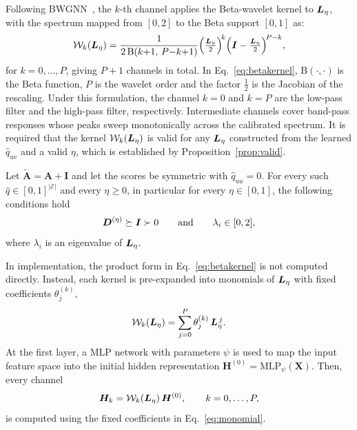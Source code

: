 Following BWGNN~\citep{BWGNN}, the $k$-th channel applies the Beta-wavelet kernel to $\bm{L}_{\eta}$, with the spectrum mapped from $[0,2]$ to the Beta support $[0,1]$ as:
\begin{equation}
\mathcal{W}_k(\bm{L}_{\eta})
=\frac{1}{2\,\mathrm B(k{+}1,\,P{-}k{+}1)}
\Bigl(\tfrac{\bm{L}_{\eta}}{2}\Bigr)^{\!k}
\Bigl(\bm I-\tfrac{\bm{L}_{\eta}}{2}\Bigr)^{\!P-k},
\label{eq:betakernel}
\end{equation}
for $k=0,\dots,P$, giving $P+1$ channels in total.
In Eq.~\eqref{eq:betakernel}, $\mathrm B(\cdot,\cdot)$ is the Beta function, $P$ is the wavelet order and
the factor $\tfrac12$ is the Jacobian of the rescaling.
Under this formulation, the channel $k=0$  and $k=P$ are the low-pass filter and the high-pass filter, respectively.
Intermediate channels cover band-pass responses whose peaks sweep monotonically across the calibrated spectrum.
It is required that the kernel $\mathcal{W}_k(\bm{L}_{\eta})$ is valid for any $\bm{L}_{\eta}$ constructed from the learned $\hat{q}_{uv}$ and a valid $\eta$, which is established by Proposition~\ref{prop:valid}.
\begin{proposition}\label{prop:valid}
Let $\tilde{\bm A}=\bm A+\bm I$ and let the scores be symmetric with $\hat q_{uu}=0$. For every such $\hat q\in[0,1]^{|\mathcal E|}$ and every $\eta\ge0$, in particular for every $\eta\in[0,1]$, the following conditions hold
\[
\bm{D}^{(\eta)}\succeq \bm I \succ 0
\qquad\text{and}\qquad
\lambda_i\in[0,2],
\]
where $\lambda_i$ is an eigenvalue of $\bm{L}_{\eta}$.
\end{proposition}
In implementation, the product form in Eq.~\eqref{eq:betakernel} is not computed directly.
Instead, each kernel is pre-expanded into monomials of $\bm{L}_{\eta}$ with fixed coefficients $\theta^{(k)}_j$,
\begin{equation}
\mathcal{W}_k(\bm{L}_{\eta})=\sum_{j=0}^{P}\theta^{(k)}_j\,\bm{L}_{\eta}^{\,j}.
\label{eq:monomial}
\end{equation}
At the first layer, a MLP network with parameters $\psi$ is used to map the input feature space into the initial hidden representation $\bm H^{(0)}= \text{MLP}_\psi(\bm X)$.
Then, every channel
\begin{equation}
\bm H_k=\mathcal{W}_k(\bm{L}_{\eta})\,\bm H^{(0)},\qquad k=0,\dots,P,
\label{eq:channels}
\end{equation}
is computed using the fixed coefficients in Eq.~\eqref{eq:monomial}.

